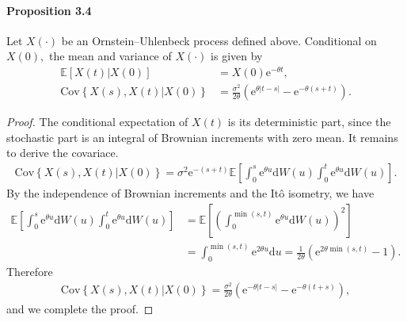 \documentclass{article}
\begin{document}
\paragraph{Proposition 3.4} Let $X(\cdot)$ be an Ornstein–Uhlenbeck process defined above. Conditional on $X(0),$ the mean and variance of $X(\cdot)$ is given by
\begin{align*}
	\mathbb{E}[X(t)|X(0)] &= X(0)\mathrm{e}^{-\theta t},\\
	\mathrm{Cov}\left\lbrace X(s), X(t)|X(0)\right\rbrace &= \frac{\sigma^2}{2\theta}\left(\mathrm{e}^{\theta\vert t-s\vert} - \mathrm{e}^{-\theta(s+t)}\right).\tag{3.16}
\end{align*}
\begin{proof}
The conditional expectation of $X(t)$ is its deterministic part, since the stochastic part is an integral of Brownian increments with zero mean. It remains to derive the covariace.
\begin{align*}
	\mathrm{Cov}\left\lbrace X(s), X(t)|X(0)\right\rbrace = \sigma^2\mathrm{e}^{-(s+t)}\mathbb{E}\left[\int_0^s \mathrm{e}^{\theta u}\mathrm{d}W(u)\int_0^t \mathrm{e}^{\theta u}\mathrm{d}W(u)\right].\tag{3.17}
\end{align*}
By the independence of Brownian increments and the Itô isometry, we have
\begin{align*}\mathbb{E}\left[\int_0^s \mathrm{e}^{\theta u}\mathrm{d}W(u)\int_0^t \mathrm{e}^{\theta u}\mathrm{d}W(u)\right] &= \mathbb{E}\left[\left(\int_0^{\min(s,t)} \mathrm{e}^{\theta u}\mathrm{d}W(u)\right)^2\right]\\
&= \int_0^{\min(s,t)} \mathrm{e}^{2\theta u}\mathrm{d}u = \frac{1}{2\theta}\left(\mathrm{e}^{2\theta\min(s,t)} - 1\right).\tag{3.18}
\end{align*}
Therefore
\begin{align*}
	\mathrm{Cov}\left\lbrace X(s), X(t)|X(0)\right\rbrace = \frac{\sigma^2}{2\theta}\left(\mathrm{e}^{-\theta\vert t-s\vert} - \mathrm{e}^{-\theta(t+s)}\right),\tag{3.19}
\end{align*}
and we complete the proof.
\end{proof} 
\end{document}

